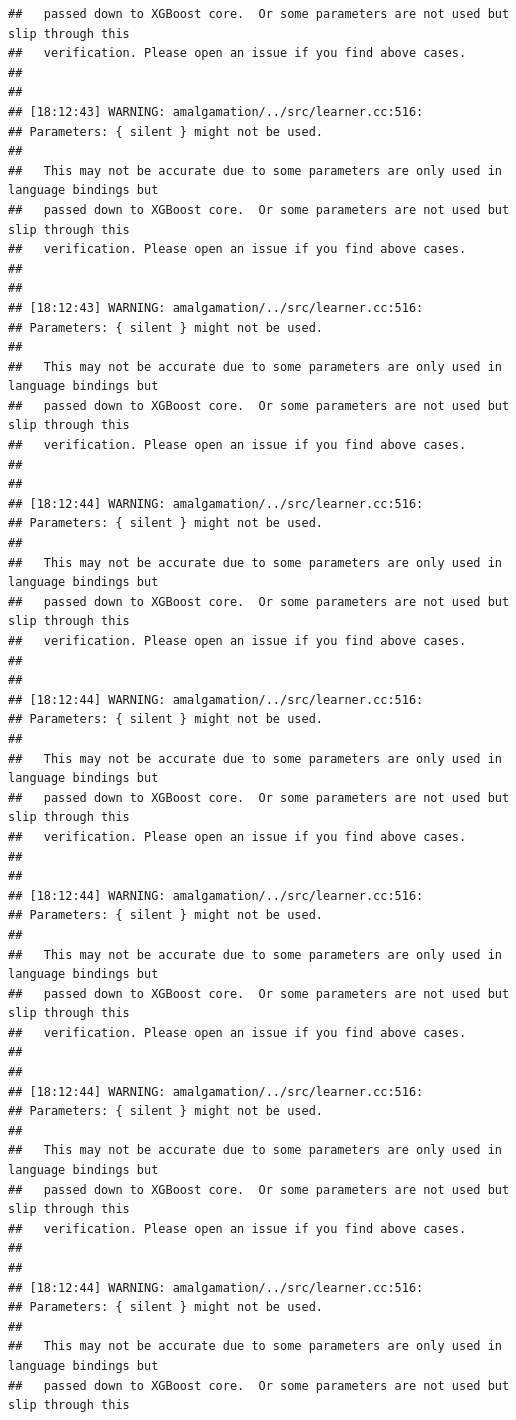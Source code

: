 \documentclass[AMS,STIX2COL]{WileyNJD-v2}\usepackage[]{graphicx}\usepackage[]{color}
\makeatletter
\newenvironment{kframe}{%
 \def\at@end@of@kframe{}%
 \ifinner\ifhmode%
  \def\at@end@of@kframe{\end{minipage}}%
  \begin{minipage}{\columnwidth}%
 \fi\fi%
 \def\FrameCommand##1{\hskip\@totalleftmargin \hskip-\fboxsep
 \colorbox{shadecolor}{##1}\hskip-\fboxsep
     \hskip-\linewidth \hskip-\@totalleftmargin \hskip\columnwidth}%
 \MakeFramed {\advance\hsize-\width
   \@totalleftmargin\z@ \linewidth\hsize
   \@setminipage}}%
 {\par\unskip\endMakeFramed%
 \at@end@of@kframe}
\newenvironment{knitrout}{}{} %
\makeatother
\begin{document}
\begin{knitrout}
\begin{kframe}
\begin{verbatim}
##   passed down to XGBoost core.  Or some parameters are not used but slip through this
##   verification. Please open an issue if you find above cases.
## 
## 
## [18:12:43] WARNING: amalgamation/../src/learner.cc:516: 
## Parameters: { silent } might not be used.
## 
##   This may not be accurate due to some parameters are only used in language bindings but
##   passed down to XGBoost core.  Or some parameters are not used but slip through this
##   verification. Please open an issue if you find above cases.
## 
## 
## [18:12:43] WARNING: amalgamation/../src/learner.cc:516: 
## Parameters: { silent } might not be used.
## 
##   This may not be accurate due to some parameters are only used in language bindings but
##   passed down to XGBoost core.  Or some parameters are not used but slip through this
##   verification. Please open an issue if you find above cases.
## 
## 
## [18:12:44] WARNING: amalgamation/../src/learner.cc:516: 
## Parameters: { silent } might not be used.
## 
##   This may not be accurate due to some parameters are only used in language bindings but
##   passed down to XGBoost core.  Or some parameters are not used but slip through this
##   verification. Please open an issue if you find above cases.
## 
## 
## [18:12:44] WARNING: amalgamation/../src/learner.cc:516: 
## Parameters: { silent } might not be used.
## 
##   This may not be accurate due to some parameters are only used in language bindings but
##   passed down to XGBoost core.  Or some parameters are not used but slip through this
##   verification. Please open an issue if you find above cases.
## 
## 
## [18:12:44] WARNING: amalgamation/../src/learner.cc:516: 
## Parameters: { silent } might not be used.
## 
##   This may not be accurate due to some parameters are only used in language bindings but
##   passed down to XGBoost core.  Or some parameters are not used but slip through this
##   verification. Please open an issue if you find above cases.
## 
## 
## [18:12:44] WARNING: amalgamation/../src/learner.cc:516: 
## Parameters: { silent } might not be used.
## 
##   This may not be accurate due to some parameters are only used in language bindings but
##   passed down to XGBoost core.  Or some parameters are not used but slip through this
##   verification. Please open an issue if you find above cases.
## 
## 
## [18:12:44] WARNING: amalgamation/../src/learner.cc:516: 
## Parameters: { silent } might not be used.
## 
##   This may not be accurate due to some parameters are only used in language bindings but
##   passed down to XGBoost core.  Or some parameters are not used but slip through this

\end{verbatim}
\end{kframe}
\end{knitrout}
\end{document}
